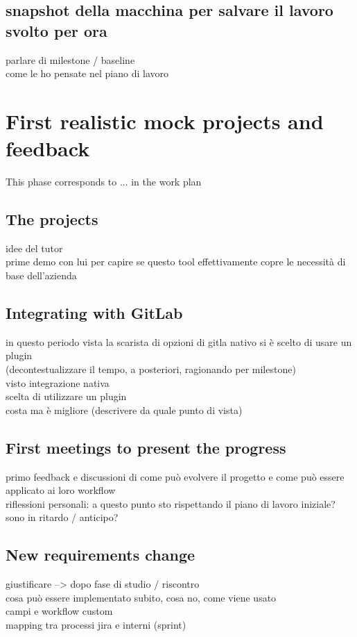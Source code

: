 	
	\subsection{snapshot della macchina per salvare il lavoro svolto per ora}
		parlare di milestone / baseline\\
		come le ho pensate nel piano di lavoro

\section{First realistic mock projects and feedback}

	This phase corresponds to ... in the work plan

	\subsection{The projects}
		idee del tutor\\
		prime demo con lui per capire se questo tool effettivamente copre le necessità di base dell'azienda
		
	\subsection{Integrating with GitLab}
		in questo periodo vista la scarista di opzioni di gitla nativo si è scelto di usare un plugin\\
		(decontestualizzare il tempo, a posteriori, ragionando per milestone)\\
		visto integrazione nativa\\
		scelta di utilizzare un plugin\\
		costa ma è migliore (descrivere da quale punto di vista)
	
	\subsection{First meetings to present the progress}
		primo feedback e discussioni di come può evolvere il progetto e come può essere applicato ai loro workflow\\
		riflessioni personali: a questo punto sto rispettando il piano di lavoro iniziale? sono in ritardo / anticipo?
	
	\subsection{New requirements change}
		giustificare --> dopo fase di studio / riscontro\\
		cosa può essere implementato subito, cosa no, come viene usato\\
		campi e workflow custom\\
		mapping tra processi jira e interni (sprint)
	
